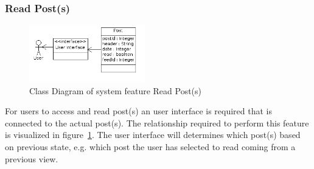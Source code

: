 \newpage
\subsubsection{Read Post(s)}
\begin{figure}[hbt]
\centering
\includegraphics[width=0.45\textwidth]
{./images/ReadPosts.png}
\caption{Class Diagram of system feature Read Post(s)}
\label{fig:read}
\end{figure}
For users to access and read post(s) an user interface is required that is connected to the actual post(s). The relationship required to perform this feature is visualized in figure~\ref{fig:read}. The user interface will determines which post(s) based on previous state, e.g. which post the user has selected to read coming from a previous view. \\
